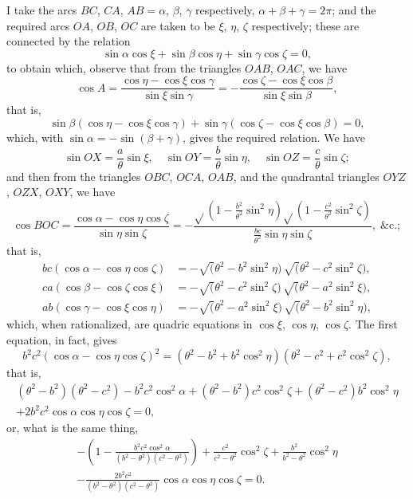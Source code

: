 \documentclass[11pt,a4paper]{book}
\begin{document}
I take the arcs $BC$, $CA$, $AB = \alpha$, $\beta$, $\gamma$ respectively, $\alpha + \beta + \gamma = 2\pi$; and the required arcs $OA$, $OB$, $OC$ are taken to be $\xi$, $\eta$, $\zeta$ respectively; these are connected by the relation
\[
\sin\alpha\cos\xi + \sin\beta\cos\eta + \sin\gamma\cos\zeta = 0,
\]
to obtain which, observe that from the triangles $OAB$, $OAC$, we have
\[
\cos A = \frac{\cos\eta - \cos\xi\cos\gamma}{\sin\xi\sin\gamma} = -\frac{\cos\zeta - \cos\xi\cos\beta}{\sin\xi\sin\beta},
\]
that is,
\[
\sin\beta(\cos\eta - \cos\xi\cos\gamma) + \sin\gamma(\cos\zeta - \cos\xi\cos\beta) = 0,
\]
which, with $\sin\alpha = -\sin(\beta+\gamma)$, gives the required relation. We have
\[
\sin OX = \frac{a}{\theta}\sin\xi,\quad \sin OY = \frac{b}{\theta}\sin\eta,\quad \sin OZ = \frac{c}{\theta}\sin\zeta;
\]
and then from the triangles $OBC$, $OCA$, $OAB$, and the quadrantal triangles $OYZ$, $OZX$, $OXY$, we have
\[
\cos BOC = \frac{\cos\alpha - \cos\eta\cos\zeta}{\sin\eta\sin\zeta} = -\frac{\sqrt{}\left(1 - \frac{b^2}{\theta^2}\sin^2\eta\right)\sqrt{}\left(1 - \frac{c^2}{\theta^2}\sin^2\zeta\right)}{\frac{bc}{\theta^2}\sin\eta\sin\zeta},\; \&\text{c.};
\]
that is,
\begin{align*}
bc(\cos\alpha - \cos\eta\cos\zeta) &= -\surd(\theta^2 - b^2\sin^2\eta)\,\surd(\theta^2 - c^2\sin^2\zeta),\\
ca(\cos\beta - \cos\zeta\cos\xi) &= -\surd(\theta^2 - c^2\sin^2\zeta)\,\surd(\theta^2 - a^2\sin^2\xi),\\
ab(\cos\gamma - \cos\xi\cos\eta) &= -\surd(\theta^2 - a^2\sin^2\xi)\,\surd(\theta^2 - b^2\sin^2\eta),
\end{align*}
which, when rationalized, are quadric equations in $\cos\xi$, $\cos\eta$, $\cos\zeta$. The first equation, in fact, gives
\[
b^2c^2(\cos\alpha - \cos\eta\cos\zeta)^2 = (\theta^2 - b^2 + b^2\cos^2\eta)(\theta^2 - c^2 + c^2\cos^2\zeta),
\]
that is,
\begin{multline}
(\theta^2-b^2)(\theta^2-c^2) - b^2c^2\cos^2\alpha + (\theta^2-b^2)c^2\cos^2\zeta + (\theta^2-c^2)b^2\cos^2\eta\\
+ 2b^2c^2\cos\alpha\cos\eta\cos\zeta = 0,
\end{multline}
or, what is the same thing,
\begin{multline}
-\left(1 - \frac{b^2c^2\cos^2\alpha}{(b^2-\theta^2)(c^2-\theta^2)}\right) + \frac{c^2}{c^2-\theta^2}\cos^2\zeta + \frac{b^2}{b^2-\theta^2}\cos^2\eta\\
- \frac{2b^2c^2}{(b^2-\theta^2)(c^2-\theta^2)}\cos\alpha\cos\eta\cos\zeta = 0.
\end{multline}
\end{document}
